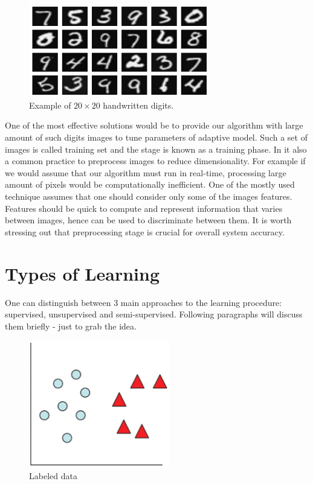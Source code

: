 \documentclass{mini}
\begin{document}
\begin{figure}
  \begin{center}
    \includegraphics[width=0.7\textwidth]{images/handwritten_digits_example.png}
  \end{center}
  \caption{Example of $20 \times 20$ handwritten digits.}
  \label{fig:handwritten_ex}
\end{figure}

One of the most effective solutions would be to provide our algorithm with large amount of such digits images to tune parameters of adaptive model. Such a set of images is called training set and the stage is known as a training phase. In it also a common practice to preprocess images to reduce dimensionality. For example if we would assume that our algorithm must run in real-time, processing large amount of pixels would be computationally inefficient. One of the mostly used technique assumes that one should consider only some of the images features. Features should be quick to compute and represent information that varies between images, hence can be used to discriminate between them. It is worth stressing out that preprocessing stage is crucial for overall system accuracy.


\section{Types of Learning}
One can distinguish between 3 main approaches to the learning procedure: supervised, unsupervised and semi-supervised. Following paragraphs will discuss them briefly - just to grab the idea.

\begin{figure}
  \begin{center}
    \includegraphics[width=0.55\textwidth]{images/supervised_graph.png}
  \end{center}
  \caption{Labeled data}
  \label{fig:handwritten_ex}
\end{figure}
\end{document}
